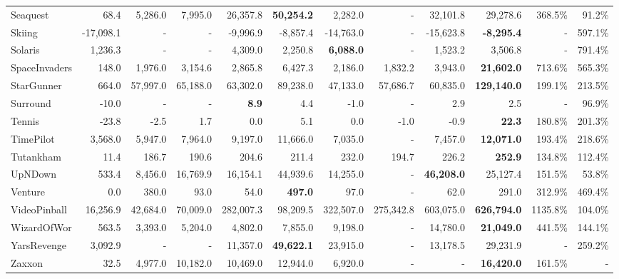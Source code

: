 \documentclass[journal]{IEEEtran}
\begin{document}
\begin{table*}[htbp]
{\begin{tabular}{lrrrrrrrrrrr}
			Seaquest & 68.4  & 5,286.0 & 7,995.0 & 26,357.8 & \textbf{50,254.2} & 2,282.0 & -     & 32,101.8 &     29,278.6  & 368.5\% & 91.2\% \\
			Skiing & -17,098.1 & -     & -     & -9,996.9 & -8,857.4 & -14,763.0 & -     & -15,623.8 &     \textbf{-8,295.4}  & -     & 597.1\% \\
			Solaris & 1,236.3 & -     & -     & 4,309.0 & 2,250.8 & \textbf{6,088.0} & -     & 1,523.2 &      3,506.8  & -     & 791.4\% \\
			SpaceInvaders & 148.0 & 1,976.0 & 3,154.6 & 2,865.8 & 6,427.3 & 2,186.0 & 1,832.2 & 3,943.0 & \textbf{   21,602.0 } & 713.6\% & 565.3\% \\
			StarGunner & 664.0 & 57,997.0 & 65,188.0 & 63,302.0 & 89,238.0 & 47,133.0 & 57,686.7 & 60,835.0 & \textbf{ 129,140.0 } & 199.1\% & 213.5\% \\
			Surround & -10.0 & -     & -     & \textbf{8.9} & 4.4   & -1.0  & -     & 2.9   &             2.5  & -     & 96.9\% \\
			Tennis & -23.8 & -2.5  & 1.7   & 0.0   & 5.1   & 0.0   & -1.0  & -0.9  & \textbf{         22.3 } & 180.8\% & 201.3\% \\
			TimePilot & 3,568.0 & 5,947.0 & 7,964.0 & 9,197.0 & 11,666.0 & 7,035.0 & -     & 7,457.0 & \textbf{   12,071.0 } & 193.4\% & 218.6\% \\
			Tutankham & 11.4  & 186.7 & 190.6 & 204.6 & 211.4 & 232.0 & 194.7 & 226.2 & \textbf{       252.9 } & 134.8\% & 112.4\% \\
			UpNDown & 533.4 & 8,456.0 & 16,769.9 & 16,154.1 & 44,939.6 & 14,255.0 & -     & \textbf{46,208.0} &     25,127.4  & 151.5\% & 53.8\% \\
			Venture & 0.0   & 380.0 & 93.0  & 54.0  & \textbf{497.0} & 97.0  & -     & 62.0  &         291.0  & 312.9\% & 469.4\% \\
			VideoPinball & 16,256.9 & 42,684.0 & 70,009.0 & 282,007.3 & 98,209.5 & 322,507.0 & 275,342.8 & 603,075.0 & \textbf{ 626,794.0 } & 1135.8\% & 104.0\% \\
			WizardOfWor & 563.5 & 3,393.0 & 5,204.0 & 4,802.0 & 7,855.0 & 9,198.0 & -     & 14,780.0 & \textbf{   21,049.0 } & 441.5\% & 144.1\% \\
			YarsRevenge & 3,092.9 & -     & -     & 11,357.0 & \textbf{49,622.1} & 23,915.0 & -     & 13,178.5 &     29,231.9  & -     & 259.2\% \\
			Zaxxon & 32.5  & 4,977.0 & 10,182.0 & 10,469.0 & 12,944.0 & 6,920.0 & -     & -     & \textbf{   16,420.0 } & 161.5\% & - \\

\end{tabular}}
\end{table*}
\end{document}
